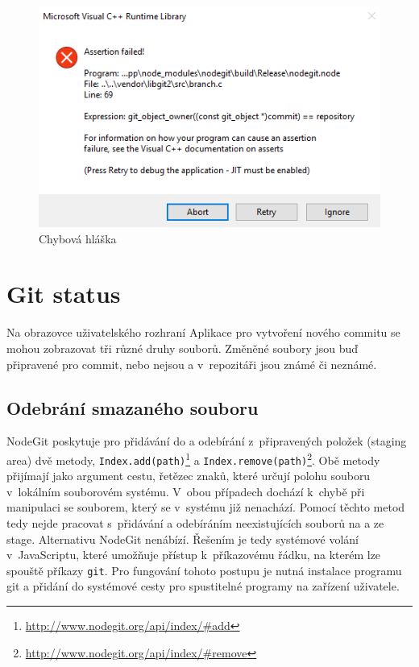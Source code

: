 \FloatBarrier
\begin{figure}[h]
	\centering
	\includegraphics[width=\textwidth]{sections/nodegit/images/branch.png}
	\caption{Chybová hláška}
\end{figure}
\FloatBarrier

\section{Git status}

Na obrazovce uživatelského rozhraní Aplikace pro vytvoření nového commitu se mohou zobrazovat tři různé druhy souborů. Změněné soubory jsou buď připravené pro commit, nebo nejsou a v~repozitáři jsou známé či neznámé.

\subsection{Odebrání smazaného souboru}

NodeGit poskytuje pro přidávání do a odebírání z~připravených položek (staging area) dvě metody, \texttt{Index.add(path)}\footnote{\url{http://www.nodegit.org/api/index/\#add}} a \texttt{Index.remove(path)}\footnote{\url{http://www.nodegit.org/api/index/\#remove}}. Obě metody přijímají jako argument cestu, řetězec znaků, které určují polohu souboru v~lokálním souborovém systému. V~obou případech dochází k~chybě při manipulaci se souborem, který se v~systému již nenachází. Pomocí těchto metod tedy nejde pracovat s~přidávání a odebíráním neexistujících souborů na a ze stage. Alternativu NodeGit nenábízí. Řešením je tedy systémové volání v~JavaScriptu, které umožňuje přístup k~příkazovému řádku, na kterém lze spouště příkazy \texttt{git}. Pro fungování tohoto postupu je nutná instalace programu git a přidání do systémové cesty pro spustitelné programy na zařízení uživatele.

